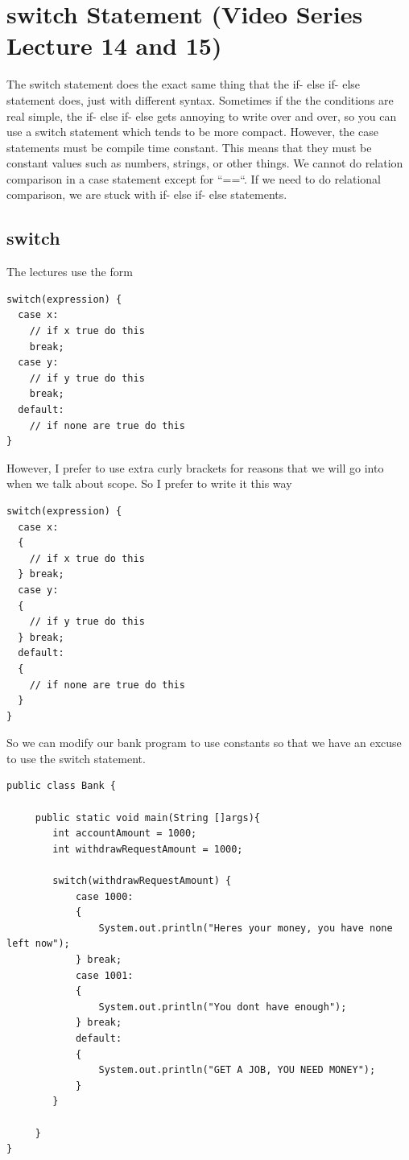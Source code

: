 \documentclass[11]{article}
\begin{document}
\section{switch Statement (Video Series Lecture 14 and 15)}
The switch statement does the exact same thing that the if- else if- else statement does, just with different syntax. Sometimes if the the conditions are real simple, the if- else if- else gets annoying to write over and over, so you can use a switch statement which tends to be more compact. However, the case statements must be compile time constant. This means that they must be constant values such as numbers, strings, or other things. We cannot do relation comparison in a case statement except for ``==``. If we need to do relational comparison, we are stuck with if- else if- else statements.

\subsection{switch}
The lectures use the form
\begin{lstlisting}
switch(expression) {
  case x:
    // if x true do this
    break;
  case y:
    // if y true do this
    break;
  default:
    // if none are true do this
}
\end{lstlisting}

However, I prefer to use extra curly brackets for reasons that we will go into when we talk about scope. So I prefer to write it this way

\begin{lstlisting}
switch(expression) {
  case x:
  {
    // if x true do this
  } break;
  case y:
  {
    // if y true do this
  } break;
  default:
  {
    // if none are true do this
  }
}
\end{lstlisting}

So we can modify our bank program to use constants so that we have an excuse to use the switch statement.

\begin{lstlisting}
public class Bank {

     public static void main(String []args){
        int accountAmount = 1000;
        int withdrawRequestAmount = 1000;
        
        switch(withdrawRequestAmount) {
            case 1000:
            {
                System.out.println("Heres your money, you have none left now");
            } break;
            case 1001:
            {
                System.out.println("You dont have enough");
            } break;
            default:
            {
                System.out.println("GET A JOB, YOU NEED MONEY");
            }
        }
        
     }
}
\end{lstlisting}
\end{document}
